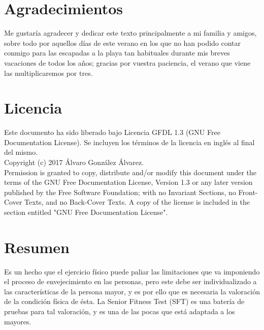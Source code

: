 

\section*{Agradecimientos}

Me gustaría agradecer y dedicar este texto principalmente a mi familia y amigos, sobre todo por aquellos días de este verano en los que no han podido contar conmigo para las escapadas a la playa tan habituales durante mis breves vacaciones de todos los años; gracias por vuestra paciencia, el verano que viene las multiplicaremos por tres.

\cleardoublepage

\section*{Licencia} %

Este documento ha sido liberado bajo Licencia GFDL 1.3 (GNU Free
Documentation License). Se incluyen los términos de la licencia en
inglés al final del mismo.\\

Copyright (c) 2017 Álvaro González Álvarez.\\

Permission is granted to copy, distribute and/or modify this document under the
terms of the GNU Free Documentation License, Version 1.3 or any later version
published by the Free Software Foundation; with no Invariant Sections, no
Front-Cover Texts, and no Back-Cover Texts. A copy of the license is included in
the section entitled "GNU Free Documentation License".\\

\cleardoublepage

\section*{Resumen}

Es un hecho que el ejercicio físico puede paliar las limitaciones que va imponiendo el proceso de envejecimiento en las personas, pero este debe ser individualizado a las características de la persona mayor, y es por ello que es necesaria la valoración de la condición física de ésta. La Senior Fitness Test (SFT) es una batería de pruebas para tal valoración, y es una de las pocas que está adaptada a los mayores.\\

